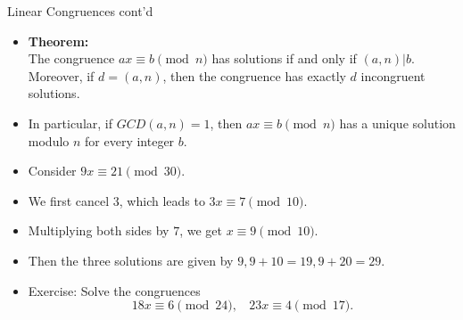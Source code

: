 \documentclass[ %
 usenames,dvipsnames,
aspectratio=169,11pt ]{beamer}
\newenvironment{stepitemize}{\begin{itemize}[<+->]}{\end{itemize} }
\begin{document}
\begin{frame}{Linear Congruences cont'd}
\begin{stepitemize}
\item {\bf Theorem:} \\
The congruence $ax\equiv b \pmod{n}$ has solutions if and only if $(a,n)|b$. Moreover, if $d=(a,n)$, then the congruence has exactly $d$ incongruent solutions.

\item In particular, if $GCD(a,n)=1$, then $ax\equiv b \pmod{n}$ has a unique solution modulo $n$ for every integer $b$.
\item Consider $9x\equiv 21 \pmod{30}.$

\item We first cancel $3$, which leads to $3x\equiv 7 \pmod{10}$.
\item Multiplying both sides by $7$, we get $x\equiv 9 \pmod{10}$.
\item Then the three solutions are given by $9, 9+10=19, 9+20=29$.
\item Exercise: Solve the congruences
$$18x\equiv 6 \pmod{24}, \:\:\:\: 23x\equiv 4 \pmod{17}.$$
\end{stepitemize}
\end{frame}
\end{document}
